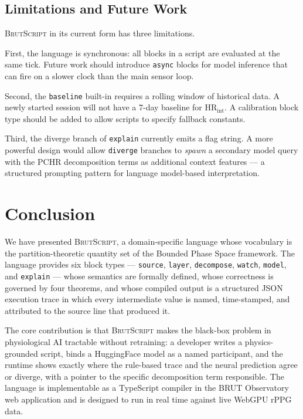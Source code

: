 \documentclass[10pt,twocolumn,a4paper]{article}
\theoremstyle{definition}
\theoremstyle{remark}
\newcommand{\BS}{\textsc{BrutScript}}
\newcommand{\HR}{\mathrm{HR}}
\begin{document}
\subsection{Limitations and Future Work}

\BS{} in its current form has three limitations.

First, the language is synchronous: all blocks in a script are
evaluated at the same tick.  Future work should introduce
\texttt{async} blocks for model inference that can fire on a slower
clock than the main sensor loop.

Second, the \texttt{baseline} built-in requires a rolling window of
historical data.  A newly started session will not have a 7-day
baseline for $\HR_{\mathrm{int}}$.  A calibration block type should
be added to allow scripts to specify fallback constants.

Third, the diverge branch of \texttt{explain} currently emits a flag
string.  A more powerful design would allow \texttt{diverge} branches
to \emph{spawn} a secondary model query with the PCHR decomposition
terms as additional context features --- a structured prompting
pattern for language model-based interpretation.

\section{Conclusion}
\label{sec:conclusion}

We have presented \BS{}, a domain-specific language whose vocabulary
is the partition-theoretic quantity set of the Bounded Phase Space
framework.  The language provides six block types --- \texttt{source},
\texttt{layer}, \texttt{decompose}, \texttt{watch}, \texttt{model},
and \texttt{explain} --- whose semantics are formally defined, whose
correctness is governed by four theorems, and whose compiled output
is a structured JSON execution trace in which every intermediate
value is named, time-stamped, and attributed to the source line that
produced it.

The core contribution is that \BS{} makes the black-box problem in
physiological AI tractable without retraining: a developer writes a
physics-grounded script, binds a HuggingFace model as a named
participant, and the runtime shows exactly where the rule-based
trace and the neural prediction agree or diverge, with a pointer to
the specific decomposition term responsible.  The language is
implementable as a TypeScript compiler in the BRUT Observatory web
application and is designed to run in real time against live WebGPU
rPPG data.



\end{document}
